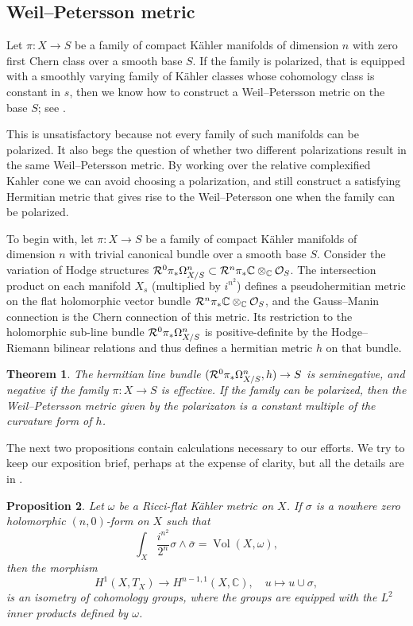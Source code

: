 \documentclass[11pt,a4paper]{amsart}
\newtheorem{theo}{Theorem}[section]
\newtheorem{prop}[theo]{Proposition}
\theoremstyle{definition}
\theoremstyle{remark}
\newcommand{\CC}{\mathbb{C}}
\newcommand{\Vol}{\mathop{\mathrm{Vol}}}
\def\rel{\CR^0\pi_*\smash{\Omega_{X/S}^n}}
\def\CO{\mathcal{O}}
\def\CR{\mathcal{R}}
\begin{document}
\subsection*{Weil--Petersson metric}


Let $\pi : X \to S$ be a family of compact K\"ahler manifolds of
dimension $n$ with zero first Chern class over a smooth base $S$. If
the family is polarized, that is equipped with a smoothly varying
family of K\"ahler classes whose cohomology class is constant in $s$,
then we know how to construct a Weil--Petersson metric on the base $S$;
see \cite{MR829406,MR784145,Tian,wang2003curvature}.

This is unsatisfactory because not every family of such manifolds can be
polarized. It also begs the question of whether two different
polarizations result in the same Weil--Petersson metric. By working over
the relative complexified Kahler cone we can avoid choosing a
polarization, and still construct a satisfying Hermitian metric that
gives rise to the Weil--Petersson one when the family can be polarized.



To begin with, let $\pi : X \to S$ be a family of compact K\"ahler
manifolds of dimension $n$ with trivial canonical bundle over a smooth
base $S$.
Consider the variation of Hodge structures $\rel \subset \CR^n\pi_*\CC
\otimes_\CC \CO_S$. The intersection product on each manifold $X_s$
(multiplied by $i^{n^2}$) defines a pseudo\-hermitian metric
on the flat holomorphic vector bundle $\CR^n\pi_*\CC \otimes_\CC
\nobreak\CO_S$, and the Gauss--Manin connection is the Chern connection
of this metric. Its restriction to the holomorphic sub-line bundle
$\rel$ is positive-definite by the Hodge--Riemann bilinear relations
and thus defines a hermitian metric $h$ on that bundle.

\begin{theo}
  \label{theoon}
  The hermitian line bundle $(\rel, h) \to S$ is seminegative,
  and negative if the family $\pi : X \to S$ is effective. If the
  family can be polarized, then the Weil--Petersson metric given by
  the polarizaton is a constant multiple of the curvature form of $h$.
\end{theo}


The next two propositions contain calculations necessary to our
efforts. We try to keep our exposition brief, perhaps at the expense
of clarity, but all the details are in \cite{Magnusson}.


\begin{prop}
  \label{propon}
  Let $\omega$ be a Ricci-flat K\"ahler metric on $X$. If $\sigma$
  is a nowhere zero holomorphic $(n,0)$-form on $X$ such that
$$
  \int_X \frac{i^{n^2}}{2^n} \sigma \wedge \overline \sigma
  = \Vol(X,\omega),
$$
then the morphism
$$
  H^1(X,T_X) \to H^{n-1,1}(X,\CC),
  \quad u \mapsto u \cup \sigma,
$$
is an isometry of cohomology groups,
where the groups are equipped with the $L^2$ inner products defined
by $\omega$.
\end{prop}
\end{document}
